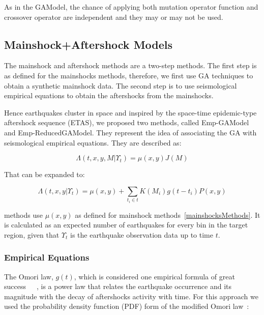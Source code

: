 As in the GAModel, the chance of applying both mutation operator function and crossover operator are independent and they may or may not be used.

\subsection{Mainshock+Aftershock Models}
The mainshock and aftershock methods are a two-step methods. The first step is as defined for the mainshocks methods, therefore, we first use GA techniques to obtain a synthetic mainshock data. The second step is to use seismological empirical equations to obtain the aftershocks from the mainshocks.


Hence earthquakes cluster in space and inspired by the space-time epidemic-type aftershock sequence (ETAS), we proposed two methods, called Emp-GAModel and Emp-ReducedGAModel. They represent the idea of associating the GA with seismological empirical equations. They are described as:

\begin{equation}\label{reducedgamodel}
	\Lambda(t,x,y,M|\Upsilon_t) = \mu(x,y)J(M)
\end{equation}

That can be expanded to:

\begin{equation}\label{emp-model}
 \Lambda(t,x,y|\Upsilon_t) = \mu(x,y) + \displaystyle\sum_{t_i \in t} K(M_i)g(t-t_i)P(x,y)
\end{equation}

 methods use $\mu(x,y)$ as defined for mainshock methods~\ref{mainshocksMethods}. It is calculated as an expected number of earthquakes for every bin in the target region, given that $\Upsilon_t$ is the earthquake observation data up to time $t$.

\subsubsection{Empirical Equations}

The Omori law, $g(t)$, which is considered one empirical formula of great success~\cite{zhuang2004analyzing}~\cite{utsu1995centenary}~\cite{omori1895after}, is a power law that relates the earthquake occurrence and its magnitude with the decay of aftershocks activity with time. For this approach we used the probability density function (PDF) form of the modified Omori law~\cite{zhuang2004analyzing}:

